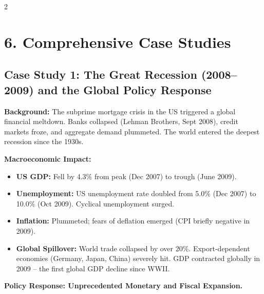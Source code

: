 \documentclass[10pt,a4paper]{article}
\begin{document}
\begin{multicols}{2}
\columnbreak

\section*{6. Comprehensive Case Studies}

\subsection*{Case Study 1: The Great Recession (2008--2009) and the Global Policy Response}

\textbf{Background:} The subprime mortgage crisis in the US triggered a global financial meltdown. Banks collapsed (Lehman Brothers, Sept 2008), credit markets froze, and aggregate demand plummeted. The world entered the deepest recession since the 1930s.

\textbf{Macroeconomic Impact:}
\begin{itemize}[leftmargin=*,nosep]
    \item \textbf{US GDP:} Fell by 4.3\% from peak (Dec 2007) to trough (June 2009).
    \item \textbf{Unemployment:} US unemployment rate doubled from 5.0\% (Dec 2007) to 10.0\% (Oct 2009). Cyclical unemployment surged.
    \item \textbf{Inflation:} Plummeted; fears of deflation emerged (CPI briefly negative in 2009).
    \item \textbf{Global Spillover:} World trade collapsed by over 20\%. Export-dependent economies (Germany, Japan, China) severely hit. GDP contracted globally in 2009 -- the first global GDP decline since WWII.
\end{itemize}

\textbf{Policy Response: Unprecedented Monetary and Fiscal Expansion.}


\end{multicols}
\end{document}

